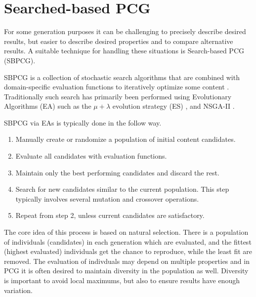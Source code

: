 \section{Searched-based PCG}




For some generation purposes it can be challenging to precisely describe desired results, but easier to describe desired properties and to compare alternative results.
A suitable technique for handling these situations is Search-based PCG (SBPCG).

SBPCG is a collection of stochastic search algorithms that are combined with domain-specific evaluation functions to iteratively optimize some content \cite{search_based_pcg} \cite{search_based_pcg2}.
Traditionally such search has primarily been performed using Evolutionary Algorithms (EA) such as the $\mu + \lambda$ evolution strategy (ES) \cite[p.18-20]{PCG_in_games}, and NSGA-II \cite{nsgaii}.

SBPCG via EAs is typically done in the follow way.
\begin{enumerate}
  \item Manually create or randomize a population of initial content candidates.
  \item Evaluate all candidates with evaluation functions.
  \item Maintain only the best performing candidates and discard the rest.
  \item Search for new candidates similar to the current population. This step typically involves several mutation and crossover operations.
  \item Repeat from step 2, unless current candidates are satisfactory.
\end{enumerate}

The core idea of this process is based on natural selection.
There is a population of individuals (candidates) in each generation which are evaluated, and the fittest (highest evaluated) individuals get the chance to reproduce, while the least fit are removed.
The evaluation of indivduals may depend on multiple properties and in PCG it is often desired to maintain diversity in the population as well.
Diversity is important to avoid local maximums, but also to ensure results have enough variation.

